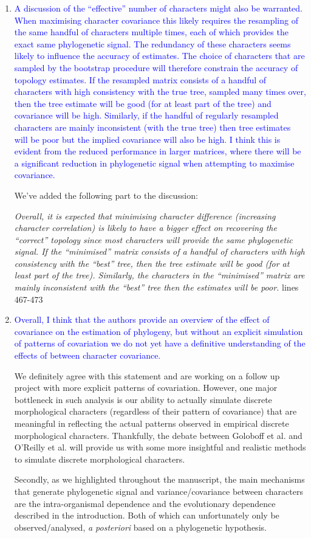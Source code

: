 \documentclass[12pt,letterpaper]{article}
\begin{document}
\begin{enumerate}
\item{\textcolor{blue}{A discussion of the ``effective'' number of characters might also be warranted. When maximising character covariance this likely requires the resampling of the same handful of characters multiple times, each of which provides the exact same phylogenetic signal. The redundancy of these characters seems likely to influence the accuracy of estimates. The choice of characters that are sampled by the bootstrap procedure will therefore constrain the accuracy of topology estimates. If the resampled matrix consists of a handful of characters with high consistency with the true tree, sampled many times over, then the tree estimate will be good (for at least part of the tree) and covariance will be high. Similarly, if the handful of regularly resampled characters are mainly inconsistent (with the true tree) then tree estimates will be poor but the implied covariance will also be high. I think this is evident from the reduced performance in larger matrices, where there will be a significant reduction in phylogenetic signal when attempting to maximise covariance.}}

We've added the following part to the discussion:

\textit{Overall, it is expected that minimising character difference (increasing character correlation) is likely to have a bigger effect on recovering the ``correct'' topology since most characters will provide the same phylogenetic signal.
If the ``minimised'' matrix consists of a handful of characters with high consistency with the ``best'' tree, then the tree estimate will be good (for at least part of the tree).
Similarly, the characters in the ``minimised'' matrix are mainly inconsistent with the ``best'' tree then the estimates will be poor.} lines 467-473

\item{\textcolor{blue}{Overall, I think that the authors provide an overview of the effect of covariance on the estimation of phylogeny, but without an explicit simulation of patterns of covariation we do not yet have a definitive understanding of the effects of between character covariance.}}

We definitely agree with this statement and are working on a follow up project with more explicit patterns of covariation.
However, one major bottleneck in such analysis is our ability to actually simulate discrete morphological characters (regardless of their pattern of covariance) that are meaningful in reflecting the actual patterns observed in empirical discrete morphological characters.
Thankfully, the debate between Goloboff et al. and O'Reilly et al. will provide us with some more insightful and realistic methods to simulate discrete morphological characters.

Secondly, as we highlighted throughout the manuscript, the main mechanisms that generate phylogenetic signal and variance/covariance between characters are the intra-organismal dependence and the evolutionary dependence described in the introduction.
Both of which can unfortunately only be observed/analysed, \textit{a posteriori} based on a phylogenetic hypothesis.


\end{enumerate}
\end{document}
